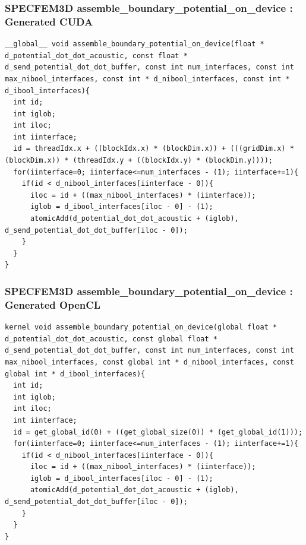 \documentclass{beamer}
\begin{document}
\begin{frame}[fragile]
\frametitle{SPECFEM3D assemble\_boundary\_potential\_on\_device : Generated CUDA\vphantom{OpenCL}}
\tiny
\lstset{style=C}
\begin{lstlisting}
__global__ void assemble_boundary_potential_on_device(float * d_potential_dot_dot_acoustic, const float * d_send_potential_dot_dot_buffer, const int num_interfaces, const int max_nibool_interfaces, const int * d_nibool_interfaces, const int * d_ibool_interfaces){
  int id;
  int iglob;
  int iloc;
  int iinterface;
  id = threadIdx.x + ((blockIdx.x) * (blockDim.x)) + (((gridDim.x) * (blockDim.x)) * (threadIdx.y + ((blockIdx.y) * (blockDim.y))));
  for(iinterface=0; iinterface<=num_interfaces - (1); iinterface+=1){
    if(id < d_nibool_interfaces[iinterface - 0]){
      iloc = id + ((max_nibool_interfaces) * (iinterface));
      iglob = d_ibool_interfaces[iloc - 0] - (1);
      atomicAdd(d_potential_dot_dot_acoustic + (iglob), d_send_potential_dot_dot_buffer[iloc - 0]);
    }
  }
}
\end{lstlisting}

\end{frame}

\begin{frame}[fragile]
\frametitle{SPECFEM3D assemble\_boundary\_potential\_on\_device : Generated OpenCL}
\tiny
\lstset{style=CL}
\begin{lstlisting}
kernel void assemble_boundary_potential_on_device(global float * d_potential_dot_dot_acoustic, const global float * d_send_potential_dot_dot_buffer, const int num_interfaces, const int max_nibool_interfaces, const global int * d_nibool_interfaces, const global int * d_ibool_interfaces){
  int id;
  int iglob;
  int iloc;
  int iinterface;
  id = get_global_id(0) + ((get_global_size(0)) * (get_global_id(1)));
  for(iinterface=0; iinterface<=num_interfaces - (1); iinterface+=1){
    if(id < d_nibool_interfaces[iinterface - 0]){
      iloc = id + ((max_nibool_interfaces) * (iinterface));
      iglob = d_ibool_interfaces[iloc - 0] - (1);
      atomicAdd(d_potential_dot_dot_acoustic + (iglob), d_send_potential_dot_dot_buffer[iloc - 0]);
    }
  }
}
\end{lstlisting}
\end{frame}

\setcounter{framenumber}{\value{finalframe}}
\end{document}
